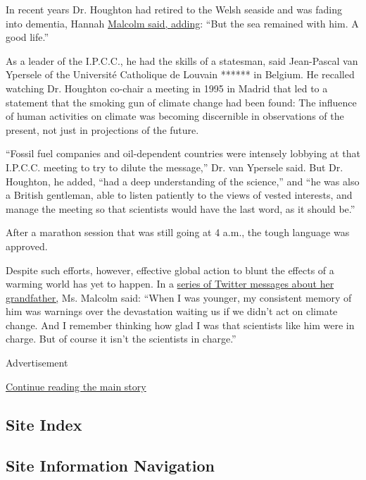In recent years Dr. Houghton had retired to the Welsh seaside and was
fading into dementia, Hannah
\href{https://twitter.com/hannahmmalcolm/status/1250778581476749314}{Malcolm
said, adding}: ``But the sea remained with him. A good life.''

As a leader of the I.P.C.C., he had the skills of a statesman, said
Jean-Pascal van Ypersele of the Université Catholique de Louvain ******
in Belgium. He recalled watching Dr. Houghton co-chair a meeting in 1995
in Madrid that led to a statement that the smoking gun of climate change
had been found: The influence of human activities on climate was
becoming discernible in observations of the present, not just in
projections of the future.

``Fossil fuel companies and oil-dependent countries were intensely
lobbying at that I.P.C.C. meeting to try to dilute the message,'' Dr.
van Ypersele said. But Dr. Houghton, he added, ``had a deep
understanding of the science,'' and ``he was also a British gentleman,
able to listen patiently to the views of vested interests, and manage
the meeting so that scientists would have the last word, as it should
be.''

After a marathon session that was still going at 4 a.m., the tough
language was approved.

Despite such efforts, however, effective global action to blunt the
effects of a warming world has yet to happen. In a
\href{https://twitter.com/hannahmmalcolm/status/1250778576405880833}{series
of Twitter messages about her grandfather,} Ms. Malcolm said: ``When I
was younger, my consistent memory of him was warnings over the
devastation waiting us if we didn't act on climate change. And I
remember thinking how glad I was that scientists like him were in
charge. But of course it isn't the scientists in charge.''

Advertisement

\protect\hyperlink{after-bottom}{Continue reading the main story}

\hypertarget{site-index}{%
\subsection{Site Index}\label{site-index}}

\hypertarget{site-information-navigation}{%
\subsection{Site Information
Navigation}\label{site-information-navigation}}

